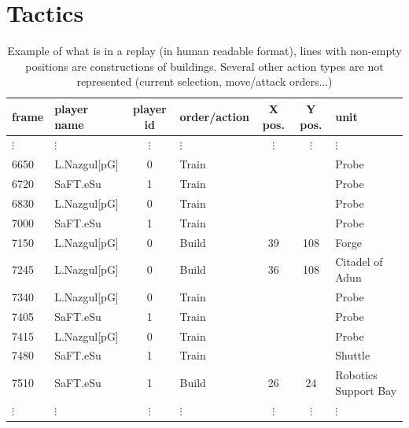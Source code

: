 \section{Tactics}

\begin{table}[!h]
\begin{center}
\begin{tabular}{|llclccl|}
\hline
frame & player name & player id & order/action & X pos. & Y pos. & unit \\
\hline
$\vdots$ & $\vdots$ & $\vdots$ & $\vdots$ & $\vdots$ & $\vdots$ & $\vdots$ \\
6650 & L.Nazgul[pG] & 0 & Train & & & Probe\\
6720 & SaFT.eSu & 1 & Train & & & Probe\\
6830 & L.Nazgul[pG] & 0 & Train & & & Probe\\
7000 & SaFT.eSu & 1 & Train & & & Probe\\
7150 & L.Nazgul[pG] & 0 & Build & 39 & 108 & Forge\\
7245 & L.Nazgul[pG] & 0 & Build & 36 & 108 & Citadel of Adun\\
7340 & L.Nazgul[pG] & 0 & Train & & & Probe\\
7405 & SaFT.eSu & 1 & Train & & & Probe\\
7415 & L.Nazgul[pG] & 0 & Train & & & Probe\\
7480 & SaFT.eSu & 1 & Train & & & Shuttle\\
7510 & SaFT.eSu & 1 & Build & 26 & 24 & Robotics Support Bay\\
$\vdots$ & $\vdots$ & $\vdots$ & $\vdots$ & $\vdots$ & $\vdots$ & $\vdots$ \\
\hline
\end{tabular}
\caption{Example of what is in a replay (in human readable format), lines with non-empty positions are constructions of buildings. Several other action types are not represented (current selection, move/attack orders...)}
\label{tab:replay_example}
\end{center}
\end{table}

